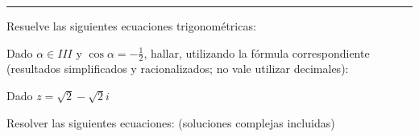 \documentclass[addpoints,spanish, 12pt,a4paper]{exam}
\begin{document}
\noindent
\rule[2ex]{\textwidth}{2pt}
\begin{questions}

\question Resuelve las siguientes ecuaciones trigonométricas:

\question Dado $\alpha \in III$ y $\cos{\alpha}=-\frac{1}{2}$, hallar, utilizando la fórmula correspondiente (resultados simplificados y racionalizados; no vale utilizar decimales):

\question Dado $z=\sqrt{2}-\sqrt{2}i$

 \question Resolver las siguientes ecuaciones: (soluciones complejas incluidas)



\end{questions}
\end{document}
